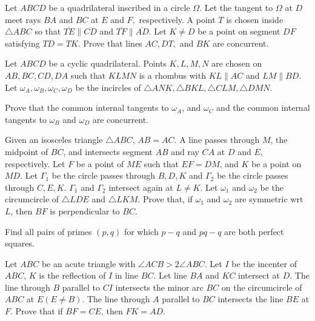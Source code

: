 \documentclass[11pt]{scrartcl}
\begin{document}
\begin{problem}[8851048763094130212]
	Let $ABCD$ be a quadrilateral inscribed in a circle $\Omega.$ Let the tangent to $\Omega$ at $D$ meet rays $BA$ and $BC$ at $E$ and $F,$ respectively. A point $T$ is chosen inside $\triangle ABC$ so that $\overline{TE}\parallel\overline{CD}$ and $\overline{TF}\parallel\overline{AD}.$ Let $K\ne D$ be a point on segment $DF$ satisfying $TD=TK.$ Prove that lines $AC,DT,$ and $BK$ are concurrent.
\end{problem}
\begin{problem}[5299971832672937326]
Let $ABCD$ be a cyclic quadrilateral. Points $K, L, M, N$ are chosen on $AB, BC, CD, DA$ such that $KLMN$ is a rhombus with $KL \parallel AC$ and $LM \parallel BD$. Let $\omega_A, \omega_B, \omega_C, \omega_D$ be the incircles of $\triangle ANK, \triangle BKL, \triangle CLM, \triangle DMN$.

Prove that the common internal tangents to $\omega_A$, and $\omega_C$ and the common internal tangents to $\omega_B$ and $\omega_D$ are concurrent.
\end{problem}
\begin{problem}[1620616963605432410]
Given an isosceles triangle $\triangle ABC$, $AB=AC$. A line passes through $M$, the midpoint of $BC$, and intersects segment $AB$ and ray $CA$ at $D$ and $E$, respectively. Let $F$ be a point of $ME$ such that $EF=DM$, and $K$ be a point on $MD$. Let $\Gamma_1$ be the circle passes through $B,D,K$ and $\Gamma_2$ be the circle passes through $C,E,K$. $\Gamma_1$ and $\Gamma_2$ intersect again at $L \neq K$. Let $\omega_1$ and $\omega_2$ be the circumcircle of $\triangle LDE$ and $\triangle LKM$. Prove that, if $\omega_1$ and $\omega_2$ are symmetric wrt $L$, then $BF$ is perpendicular to $BC$.
\end{problem}
\begin{problem}[2302470517258475835]
	Find all pairs of primes $(p, q)$ for which $p-q$ and $pq-q$ are both perfect squares.
\end{problem}
\begin{problem}[156060759856343521]
Let $ABC$ be an acute triangle with $\angle ACB>2 \angle ABC$. Let $I$ be the incenter of $ABC$, $K$ is the reflection of $I$ in line $BC$. Let line $BA$ and $KC$ intersect at $D$. The line through $B$ parallel to $CI$ intersects the minor arc $BC$ on the circumcircle of $ABC$ at $E(E \neq B)$. The line through $A$ parallel to $BC$ intersects the line $BE$ at $F$.
Prove that if $BF=CE$, then $FK=AD$.
\end{problem}
\end{document}
